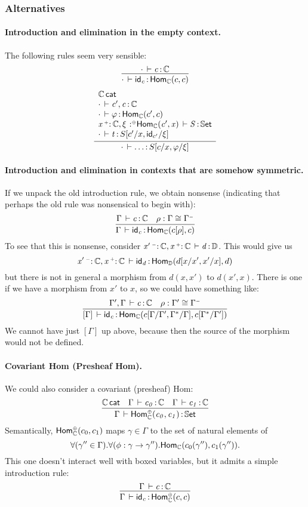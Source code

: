 \documentclass[11pt]{article}
\theoremstyle{plain}
\begin{document}
\subsubsection{Alternatives}
\paragraph{Introduction and elimination in the empty context.}
The following rules seem very sensible:
\[
	\infer{
		\oftp{\cdot}{\idm c}{\Hom{\C}{c}{c}}
	}{
		\oftp{\cdot}{c}{\C}
	}
\]
\begin{equation}
	\infer{
		\oftp{\cdot}{\ldots}{S[c/x, \vfi/\xi]}
	}{ \begin{array}{l}
		\wfdtp{\C} \\
		\oftp{\cdot}{c', c}{\C} \\
		\oftp{\cdot}{\vfi}{\Hom{\C}{c'}{c}} \\
		\oftp{\catvar{x}{\co}{\C}, \tpvar{\xi}{\coc}{\Hom{\C}{c'}{x}} }{S}{\types} \\
		\oftp{\cdot}{t}{S[c'/x, \idm{c'}/\xi]}
	\end{array} }
\end{equation}

\paragraph{Introduction and elimination in contexts that are somehow symmetric.}
If we unpack the old introduction rule, we obtain nonsense (indicating that perhaps the old rule was nonsensical to begin with):
\[
	\infer{
		\oftp{\Gamma}{\idm c}{\Hom{\C}{c[\rho]}{c}}
	}{
		\oftp{\Gamma}{c}{\C} &
		\rho : \Gamma \cong \Gamma^\con
	}
\]
To see that this is nonsense, consider ${\mathit{x'} \,^{{\text{\tiny $\mathord{-}$}}}{:}^{\,} \mathit{\mathbb{C}}, \mathit{x} \,^{{\text{\tiny $\mathord{+}$}}}{:}^{\,} \mathit{\mathbb{C}}} \, \vdash \mathit{d} \, \mathit{:} \, \mathbb{D}$. This would give us
\[
	{\mathit{x'} \,^{{\text{\tiny $\mathord{-}$}}}{:}^{\,} \mathit{\mathbb{C}}, \mathit{x} \,^{{\text{\tiny $\mathord{+}$}}}{:}^{\,} \mathit{\mathbb{C}}} \, \vdash \mathit{\mathsf{id}_{d}} \, \mathit{:} \, \mathsf{Hom}_{\mathbb{D}}(d[x/x', x'/x],d)
\]
but there is not in general a morphism from $d(x, x')$ to $d(x', x)$. There is one if we have a morphism from $x'$ to $x$, so we could have something like:
\[
	\infer{
		\oftp{[\Gamma]}{\idm c}{\Hom{\C}{c[\Gamma/\Gamma', \Gamma^*/\Gamma]}{c[\Gamma^*/\Gamma']}}
	}{
		\oftp{\Gamma', \Gamma}{c}{\C} &
		\rho : \Gamma' \cong \Gamma^\con
	}
\]
We cannot have just $[\Gamma]$ up above, because then the source of the morphism would not be defined.

\paragraph{Covariant Hom (Presheaf Hom).}
We could also consider a covariant (presheaf) Hom:
\[
	\infer{
		\ofdtp{\Gamma}{\Hombind{\C}{\coc}{c_0}{c_1}}{\types}
	}{
		\wfdtp{\C} &
		\oftp{\Gamma}{c_0}{\C} & 
		\oftp{\Gamma}{c_1}{\C} 
	}
\]
Semantically, $\mathsf{Hom}_{\mathbb{C}}^{{\text{\tiny $\mathord{\oplus}$}}}(c_0,c_1)$ maps $\gamma \in \Gamma$ to the set of natural elements of
\[
	\forall (\gamma'' \in \Gamma). \forall (\phi : \gamma \to \gamma'').\mathsf{Hom}_{\mathbb{C}}(c_0(\gamma''),c_1(\gamma'')).
\]
This one doesn't interact well with boxed variables, but it admits a simple introduction rule:
\[
	\infer{
		\oftp{\Gamma}{\idm c}{\Hombind{\C}{\coc}{c}{c}}
	}{
		\oftp{\Gamma}{c}{\C}
	}
\]
\end{document}
